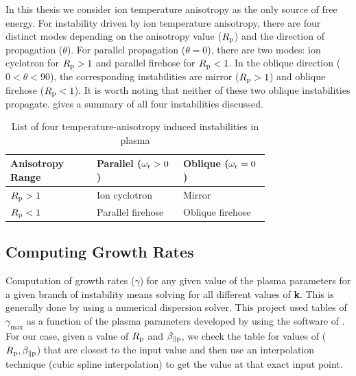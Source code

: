             In this thesis we consider ion temperature anisotropy as the only source of free energy.
            For instability driven by ion temperature anisotropy, there are four distinct modes
            depending on the anisotropy value ($R_{\rm p}$) and the direction of propagation
            ($\theta$). For parallel propagation ($\theta=0$), there are two modes: ion cyclotron
            for $R_{\rm p} > 1$ and parallel firehose for $R_{\rm p} < 1$. In the oblique direction
            ($0 < \theta < 90$), the corresponding instabilities are mirror ($R_{\rm p} > 1$) and
            oblique firehose ($R_{\rm p} < 1$). It is worth noting that neither of these two oblique
            instabilities propagate.  gives a summary of all four instabilities
            discussed.

            \begin{table}[ht]
                \centering
                \caption[Microkinetic instabilities]{List of four temperature-anisotropy induced instabilities in plasma}
                \begin{tabular}{ | p{0.25\linewidth} | p{0.25\linewidth} | p{0.25\linewidth}| }
                    \hline
                    Anisotropy Range & Parallel ($\omega_{\rm r} > 0$) & Oblique ($\omega_{\rm r} =
                    0$)\\
                    \hline
                    $R_{\rm p} > 1$ & Ion cyclotron & Mirror\\
                    \hline
                    $R_{\rm p} < 1$ & Parallel firehose & Oblique firehose\\
                    \hline
                \end{tabular}
                \label{tab:instab}
            \end{table}

        \subsection{Computing Growth Rates}\label{sec:cgr}

            Computation of growth rates ($\gamma$) for any given value of the plasma parameters for
            a given branch of instability means solving  for all different values of
            \textbf{k}. This is generally done by using a numerical dispersion solver. This project
            used tables of $\gamma_{\max}$ as a function of the plasma parameters developed by
            \citet{Maruca2012} using the software of \citet{Gary1993}. For our case, given a value
            of $R_{\rm p}$ and $\beta_{\parallel \rm p}$, we check the table for values of ($R_{\rm
            p}, \beta_{\parallel \rm p}$) that are closest to the input value and then use an
            interpolation technique (cubic spline interpolation) to get the value at that exact
            input point.

